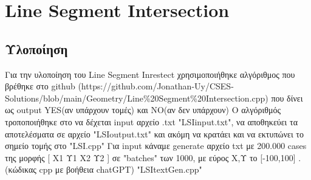 \section{Line Segment Intersection}

\subsection{Υλοποίηση}
Για την υλοποίηση του Line Segment Inrestect χρησιμοποιήθηκε αλγόριθμος που βρέθηκε στο github (https://github.com/Jonathan-Uy/CSES-Solutions/blob/main/Geometry/Line\%20Segment\%20Intersection.cpp) που δίνει ως output YES(αν υπάρχουν τομές) και NO(αν δεν υπάρχουν)
O αλγόριθμός τροποποιήθηκε στο να δέχεται input αρχείο .txt "LSIinput.txt", να αποθηκεύει τα αποτελέσματα σε αρχείο "LSIoutput.txt" και ακόμη να κρατάει και να εκτυπώνει το σημείο τομής στο "LSI.cpp"
Για input κάναμε generate αρχείο txt με 200.000 cases της μορφής [ Χ1 Υ1 Χ2 Υ2 ] σε "batches" των 1000, με εύρος Χ,Υ το [-100,100] . (κώδικας cpp με βοήθεια chatGPT) "LSItextGen.cpp" 
